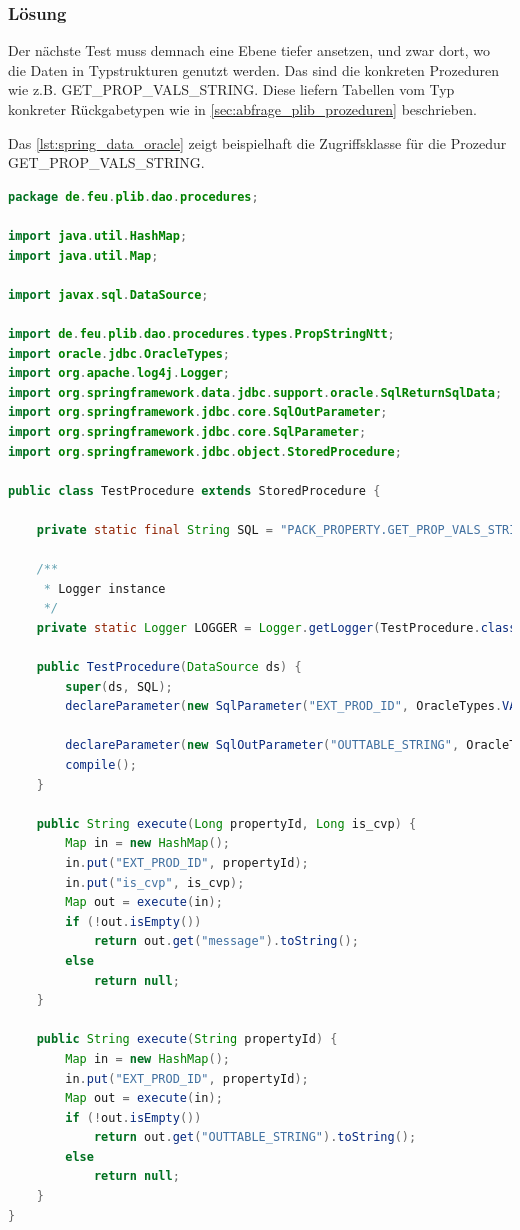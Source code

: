 \subsubsection{Lösung}

Der nächste Test muss demnach eine Ebene tiefer ansetzen, und zwar dort, wo die Daten in Typstrukturen genutzt werden. Das sind die konkreten Prozeduren wie z.B. GET\_PROP\_VALS\_STRING. Diese liefern Tabellen vom Typ konkreter Rückgabetypen wie in \autoref{sec:abfrage_plib_prozeduren} beschrieben. 

Das \autoref{lst:spring_data_oracle} zeigt beispielhaft die Zugriffsklasse für die Prozedur GET\_PROP\_VALS\_STRING.

\begin{lstlisting}[caption=Spring Data Oracle - Aufruf der Prozeduren mit Rückgabetabellen, language=java, label=lst:spring_data_oracle]
package de.feu.plib.dao.procedures;

import java.util.HashMap;
import java.util.Map;

import javax.sql.DataSource;

import de.feu.plib.dao.procedures.types.PropStringNtt;
import oracle.jdbc.OracleTypes;
import org.apache.log4j.Logger;
import org.springframework.data.jdbc.support.oracle.SqlReturnSqlData;
import org.springframework.jdbc.core.SqlOutParameter;
import org.springframework.jdbc.core.SqlParameter;
import org.springframework.jdbc.object.StoredProcedure;

public class TestProcedure extends StoredProcedure {

    private static final String SQL = "PACK_PROPERTY.GET_PROP_VALS_STRING";

    /**
     * Logger instance
     */
    private static Logger LOGGER = Logger.getLogger(TestProcedure.class);

	public TestProcedure(DataSource ds) {
		super(ds, SQL);
		declareParameter(new SqlParameter("EXT_PROD_ID", OracleTypes.VARCHAR));

		declareParameter(new SqlOutParameter("OUTTABLE_STRING", OracleTypes.STRUCT, "PACK_PROPERTY.PROP_STRING_NTT", new SqlReturnSqlData(PropStringNtt.class)));
		compile();
	}

	public String execute(Long propertyId, Long is_cvp) {
		Map in = new HashMap();
		in.put("EXT_PROD_ID", propertyId);
        in.put("is_cvp", is_cvp);
		Map out = execute(in);
		if (!out.isEmpty())
			return out.get("message").toString();
		else
			return null;
	}

    public String execute(String propertyId) {
		Map in = new HashMap();
		in.put("EXT_PROD_ID", propertyId);
		Map out = execute(in);
		if (!out.isEmpty())
			return out.get("OUTTABLE_STRING").toString();
		else
			return null;
	}
}
\end{lstlisting}

